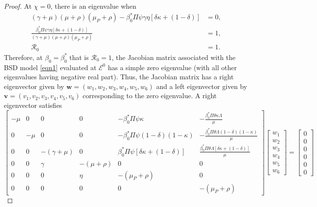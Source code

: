 \documentclass[11pt]{article}
\newcommand\bfv{\mathbf{v}}
\newcommand\bfw{\mathbf{w}}
\numberwithin{equation}{section}
\begin{document}
\begin{proof}
    At $\chi=0$, there is an eigenvalue when
    \begin{align*}
        (\gamma+\mu)(\mu+\rho)(\mu_P+\rho)-\beta_0^*\Pi\psi\gamma\eta[\delta\kappa+(1-\delta)]&=0,\\
        \frac{\beta_0^*\Pi\psi\gamma\eta[\delta\kappa+(1-\delta)]}{(\gamma+\mu)(\mu+\rho)(\mu_P+\rho)}&=1,\\
        \mathcal{R}_0&=1.
    \end{align*}
    Therefore, at $\beta_0=\beta_0^*$ that is $\mathcal{R}_0=1$, the Jacobian matrix associated with the BSD model \eqref{eqn1}  evaluated at $\mathcal{E}^0$ has a simple zero eigenvalue (with all other eigenvalues having negative real part). Thus, the Jacobian matrix has a right eigenvector given by $\bfw=(w_1,w_2,w_3,w_4,w_5,w_6)$ and a left eigenvector given by $\bfv=(v_1,v_2,v_3,v_4,v_5,v_6)$ corresponding to the zero eigenvalue. A right eigenvector satisfies
    \begin{equation}\label{eqn10}
        \begin{bmatrix}
            -\mu&0&0&0&-\beta_0^*\Pi\psi\kappa&-\frac{\beta_0^*\Pi\theta\kappa\Lambda}{\mu}\\
            0&-\mu&0&0&-\beta_0^*\Pi\psi(1-\delta)(1-\kappa)&-\frac{\beta_0^*\Pi\theta\Lambda(1-\delta)(1-\kappa)}{\mu}\\
            0&0&-(\gamma+\mu)&0&\beta_0^*\Pi\psi[\delta\kappa+(1-\delta)]&\frac{\beta_0^*\Pi\theta\Lambda[\delta\kappa+(1-\delta)]}{\mu}\\
            0&0&\gamma&-(\mu+\rho)&0&0\\
            0&0&0&\eta&-(\mu_P+\rho)&0\\
            0&0&0&0&0&-(\mu_P+\rho)
        \end{bmatrix}
        \begin{bmatrix}
            w_1\\w_2\\w_3\\w_4\\w_5\\w_6
        \end{bmatrix}
        =
        \begin{bmatrix}
            0\\0\\0\\0\\0\\0
        \end{bmatrix}
    \end{equation}

\end{proof}
\end{document}
